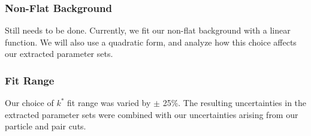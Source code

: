 \documentclass[../AnalysisNoteJBuxton.tex]{subfiles}
\begin{document}
\subsubsection{Non-Flat Background}
\label{SysErrsLamKch:NonFlatBgd}

Still needs to be done.  Currently, we fit our non-flat background with a linear function.  We will also use a quadratic form, and analyze how this choice affects our extracted parameter sets.

\subsubsection{Fit Range}
\label{SysErrsLamKch:FitRange}

Our choice of $k^{*}$ fit range was varied by $\pm$ 25\%.  The resulting uncertainties in the extracted parameter sets were combined with our uncertainties arising from our particle and pair cuts.
\end{document}

